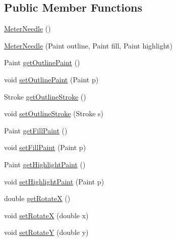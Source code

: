 \subsection*{Public Member Functions}
\begin{DoxyCompactItemize}
\item 
\mbox{\hyperlink{classorg_1_1jfree_1_1chart_1_1needle_1_1_meter_needle_a373a8977de8debe7b0cf6a6d478dd073}{Meter\+Needle}} ()
\item 
\mbox{\hyperlink{classorg_1_1jfree_1_1chart_1_1needle_1_1_meter_needle_ad6d7ad1e34f1cc0314cfe9e5cb42164c}{Meter\+Needle}} (Paint outline, Paint fill, Paint highlight)
\item 
Paint \mbox{\hyperlink{classorg_1_1jfree_1_1chart_1_1needle_1_1_meter_needle_a29c09f7ef8ef55321b1b0a33109ea60f}{get\+Outline\+Paint}} ()
\item 
void \mbox{\hyperlink{classorg_1_1jfree_1_1chart_1_1needle_1_1_meter_needle_a708262f63aa91bf379c234ccadd09896}{set\+Outline\+Paint}} (Paint p)
\item 
Stroke \mbox{\hyperlink{classorg_1_1jfree_1_1chart_1_1needle_1_1_meter_needle_ac3f89646c4b2e166fe0eea1748054c86}{get\+Outline\+Stroke}} ()
\item 
void \mbox{\hyperlink{classorg_1_1jfree_1_1chart_1_1needle_1_1_meter_needle_a19acb01ff14909fe09942748b1d533a1}{set\+Outline\+Stroke}} (Stroke s)
\item 
Paint \mbox{\hyperlink{classorg_1_1jfree_1_1chart_1_1needle_1_1_meter_needle_a6312b747261f3f23e451b9f9765ae8ac}{get\+Fill\+Paint}} ()
\item 
void \mbox{\hyperlink{classorg_1_1jfree_1_1chart_1_1needle_1_1_meter_needle_abddc23c476734530a5efae98d75fab9e}{set\+Fill\+Paint}} (Paint p)
\item 
Paint \mbox{\hyperlink{classorg_1_1jfree_1_1chart_1_1needle_1_1_meter_needle_a9d91cc001420b88e5f02477ec44a1f76}{get\+Highlight\+Paint}} ()
\item 
void \mbox{\hyperlink{classorg_1_1jfree_1_1chart_1_1needle_1_1_meter_needle_a0b2d30a4985c06f63f9d8276f6f8cac6}{set\+Highlight\+Paint}} (Paint p)
\item 
double \mbox{\hyperlink{classorg_1_1jfree_1_1chart_1_1needle_1_1_meter_needle_ae0007e8d62f5c24c9b53183966a3241a}{get\+RotateX}} ()
\item 
void \mbox{\hyperlink{classorg_1_1jfree_1_1chart_1_1needle_1_1_meter_needle_a79601f9d91e0d366f19b95e25e640a82}{set\+RotateX}} (double x)
\item 
void \mbox{\hyperlink{classorg_1_1jfree_1_1chart_1_1needle_1_1_meter_needle_ad5fceff1f08bf59ee96b0b773a9e3363}{set\+RotateY}} (double y)

\end{DoxyCompactItemize}
